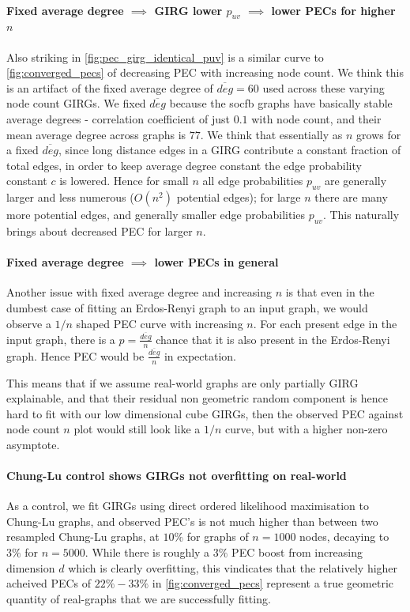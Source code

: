 \paragraph{Fixed average degree $\implies$ GIRG lower $p_{uv}$ $\implies$ lower PECs for higher $n$}
Also striking in \cref{fig:pec_girg_identical_puv} is a similar curve to \cref{fig:converged_pecs} of decreasing PEC with increasing node count. We think this is an artifact of the fixed average degree of $\overline{deg} = 60$ used across these varying node count GIRGs. We fixed $\overline{deg}$ because the socfb graphs have basically stable average degrees - correlation coefficient of just $0.1$ with node count, and their mean average degree across graphs is $77$. We think that essentially as $n$ grows for a fixed $\overline{deg}$, since long distance edges in a GIRG contribute a constant fraction of total edges, in order to keep average degree constant the edge probability constant $c$ is lowered. Hence for  small $n$ all edge probabilities $p_{uv}$ are generally larger and less numerous ($O(n^2)$ potential edges); for large $n$ there are many more potential edges, and generally smaller edge probabilities $p_{uv}$. This naturally brings about decreased PEC for larger $n$.

\paragraph{Fixed average degree $\implies$ lower PECs in general}
Another issue with fixed average degree and increasing $n$ is that even in the dumbest case of fitting an Erdos-Renyi graph to an input graph, we would observe a $1/n$ shaped PEC curve with increasing $n$. For each present edge in the input graph, there is a $p = \frac{\overline{deg}}{n}$ chance that it is also present in the Erdos-Renyi graph. Hence PEC would be $\frac{\overline{deg}}{n}$ in expectation.

This means that if we assume real-world graphs are only partially GIRG explainable, and that their residual non geometric random component is hence hard to fit with our low dimensional cube GIRGs, then the observed PEC against node count $n$ plot would still look like a $1/n$ curve, but with a higher non-zero asymptote.

\paragraph{Chung-Lu control shows GIRGs not overfitting on real-world}
As a control, we fit GIRGs using direct ordered likelihood maximisation to Chung-Lu graphs, and observed PEC's is not much higher than between two resampled Chung-Lu graphs, at $10\%$ for graphs of $n=1000$ nodes, decaying to $3\%$ for $n=5000$. While there is roughly a $3\%$ PEC boost from increasing dimension $d$ which is clearly overfitting, this vindicates that the relatively higher acheived PECs of $22\% - 33\%$ in \cref{fig:converged_pecs} represent a true geometric quantity of real-graphs that we are successfully fitting.

